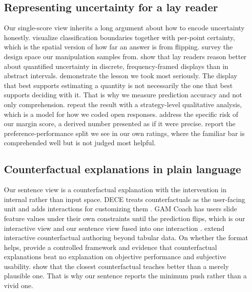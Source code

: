 \documentclass[sigconf]{acmart}
\begin{document}
\subsection{Representing uncertainty for a lay reader}

Our single-score view inherits a long argument about how to encode uncertainty honestly.
\citet{schulzDeepViewVisualizingClassification2019} visualize classification boundaries together with per-point
certainty, which is the spatial version of how far an answer is from flipping.
\citet{padillaUncertaintyVisualization2021} survey the design space our manipulation samples from.
\citet{kayWhenIshMy2016} show that lay readers reason better about quantified uncertainty in discrete,
frequency-framed displays than in abstract intervals. \citet{fernandesUncertaintyDisplaysUsing2018} demonstrate
the lesson we took most seriously. The display that best supports estimating a quantity is not necessarily the
one that best supports deciding with it. That is why we measure prediction accuracy and not only comprehension.
\citet{kaleVisualReasoningStrategies2020} repeat the result with a strategy-level qualitative analysis, which is
a model for how we coded open responses.
\citet{correllValueSuppressingUncertaintyPalettes2018} address the specific risk of our margin score, a derived
number presented as if it were precise. \citet{bisantzDisplayingUncertaintyInvestigating2005} report the
preference-performance split we see in our own ratings, where the familiar bar is comprehended well but is not
judged most helpful.

\subsection{Counterfactual explanations in plain language}

Our sentence view is a counterfactual explanation with the intervention in internal rather than input space.
DECE treats counterfactuals as the user-facing unit and adds interactions for customizing them
\cite{chengDECEDecisionExplorer2020}. GAM Coach has users slide feature values under their own constraints until
the prediction flips, which is our interactive view and our sentence view fused into one interaction
\cite{wangGAMCoachInteractive2023}. \citet{schlegelInteractiveCounterfactualGeneration2024} extend interactive
counterfactual authoring beyond tabular data. On whether the format helps,
\citet{kuhlLetsGoAlien2023} provide a controlled framework and evidence that counterfactual explanations beat no
explanation on objective performance and subjective usability.
\citet{kuhlKeepYourFriends2022} show that the closest counterfactual teaches better than a merely plausible one.
That is why our sentence reports the minimum push rather than a vivid one.
\end{document}
